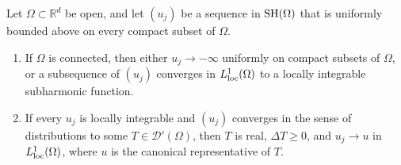 \begin{theorem}\label{thm:subharmonic-compactness}
Let $\Omega\subset\mathbb R^d$ be open, and let $(u_j)$ be a sequence in $\mathrm{SH}(\Omega)$ that is uniformly bounded above on every compact subset of $\Omega$.
\begin{enumerate}
\item If $\Omega$ is connected, then either $u_j\to-\infty$ uniformly on compact subsets of $\Omega$, or a subsequence of $(u_j)$ converges in $L^1_{\mathrm{loc}}(\Omega)$ to a locally integrable subharmonic function.
\item If every $u_j$ is locally integrable and $(u_j)$ converges in the sense of distributions to some $T\in\mathcal D'(\Omega)$, then $T$ is real, $\Delta T\geq0$, and $u_j\to u$ in $L^1_{\mathrm{loc}}(\Omega)$, where $u$ is the canonical representative of $T$.
\end{enumerate}
\end{theorem}
